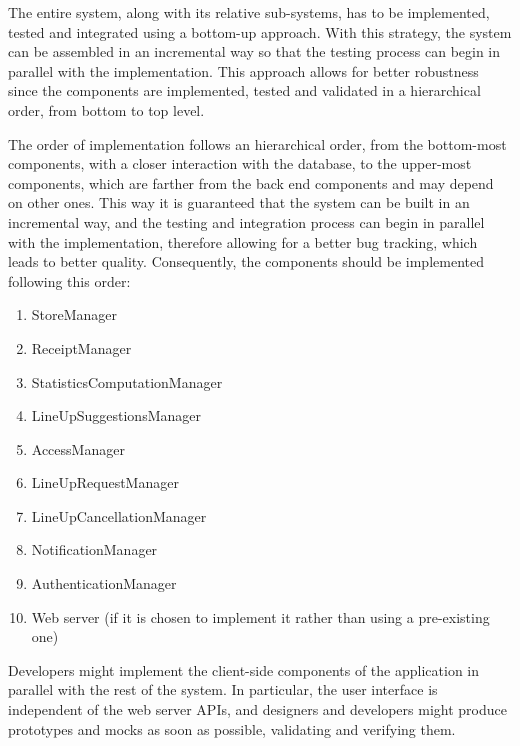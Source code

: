 \documentclass[../../main.tex]{subfiles}
\begin{document}
The entire system, along with its relative sub-systems, has to be implemented, tested and integrated using a bottom-up approach. 
With this strategy, the system can be assembled in an incremental way so that the testing process can begin in parallel with the implementation. 
This approach allows for better robustness since the components are implemented, tested and validated in a hierarchical order, from bottom to top level.


The order of implementation follows an hierarchical order, from the bottom-most components, with a closer interaction with the database, to the upper-most components, which are farther from the back end components and may depend on other ones. 
This way it is guaranteed that the system can be built in an incremental way, and the testing and integration process can begin in parallel with the implementation, therefore allowing for a better bug tracking, which leads to better quality. 
Consequently, the components should be implemented following this order:

\begin{enumerate}

	\item StoreManager
	\item ReceiptManager
	\item StatisticsComputationManager
	\item LineUpSuggestionsManager
	\item AccessManager
	\item LineUpRequestManager
	\item LineUpCancellationManager
	\item NotificationManager
	\item AuthenticationManager
	\item Web server (if it is chosen to implement it rather than using a pre-existing one)

\end{enumerate}

Developers might implement the client-side components of the application in parallel with the rest of the system. 
In particular, the user interface is independent of the web server APIs, and designers and developers might produce prototypes and mocks as soon as possible, validating and verifying them.
\end{document}
